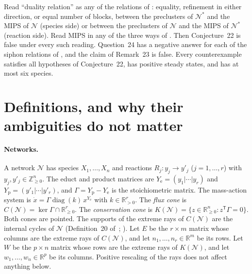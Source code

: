 \documentclass[11pt,a4paper]{report}
\providecommand{\R}{\mathbb{R}}
\providecommand{\Z}{\mathbb{Z}}
\newcommand{\Net}{\mathcal{N}}
\newcommand{\Ye}{Y_{\mathrm e}}
\newcommand{\Yp}{Y_{\mathrm p}}
\begin{document}
\begin{theorem}\label{thm:main}
Read ``duality relation'' as any of the relations of : equality, refinement in either
direction, or equal number of blocks, between the preclusters of \(\Net^*\) and the MIPS of \(\Net\) (species side) or
between the preclusters of \(\Net\) and the MIPS of \(\Net^*\) (reaction side). Read MIPS in any of the three ways of
. Then Conjecture~22 is false under every such reading. Question~24 has a negative answer for each
of the siphon relations of , and the claim of Remark~23 is false. Every counterexample
satisfies all hypotheses of Conjecture~22, has positive steady states, and has at most six species.
\end{theorem}

\section{Definitions, and why their ambiguities do not matter}

\paragraph{Networks.} A network \(\Net\) has species \(X_1,\dots,X_n\) and reactions \(R_j\colon y_j\to y'_j\)
(\(j=1,\dots,r\)) with \(y_j,y'_j\in\Z^n_{\ge0}\). The educt and product matrices are \(\Ye=(y_1|\cdots|y_r)\) and
\(\Yp=(y'_1|\cdots|y'_r)\), and \(\Gamma=\Yp-\Ye\) is the stoichiometric matrix. The mass-action system is
\(\dot x=\Gamma\operatorname{diag}(k)\,x^{\Ye}\) with \(k\in\R^r_{>0}\). The \emph{flux cone} is
\(C(\Net)=\ker\Gamma\cap\R^r_{\ge0}\). The \emph{conservation cone} is
\(K(\Net)=\{z\in\R^n_{\ge0}:z^{\mathsf T}\Gamma=0\}\). Both cones are pointed. The supports of the extreme rays of
\(C(\Net)\) are the internal cycles of \(\Net\) (Definition~20 of~\autocite{Iosif2026};
\autocite{SchusterHilgetag1994}). Let \(E\) be the \(r\times m\) matrix whose columns are the extreme rays of
\(C(\Net)\), and let \(n_1,\dots,n_r\in\R^m\) be its rows. Let \(W\) be the \(p\times n\) matrix whose rows are the
extreme rays of \(K(\Net)\), and let \(w_1,\dots,w_n\in\R^p\) be its columns. Positive rescaling of the rays does not
affect anything below.
\end{document}
